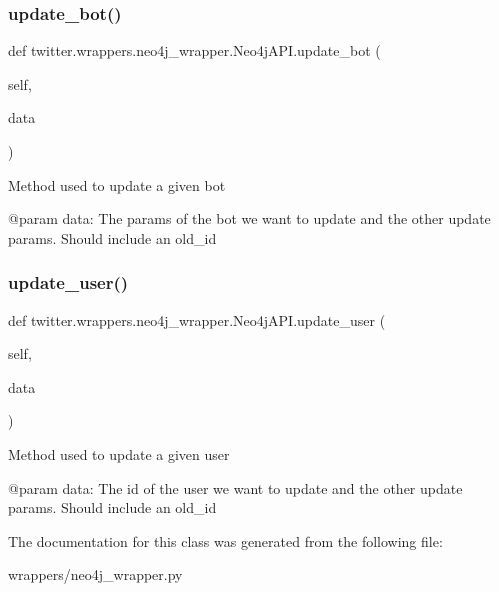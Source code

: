\subsubsection{\texorpdfstring{update\+\_\+bot()}{update\_bot()}}
{\footnotesize\ttfamily def twitter.\+wrappers.\+neo4j\+\_\+wrapper.\+Neo4j\+A\+P\+I.\+update\+\_\+bot (\begin{DoxyParamCaption}\item[{}]{self,  }\item[{}]{data }\end{DoxyParamCaption})}

\begin{DoxyVerb}Method used to update a given bot

@param data: The params of the bot we want to update and the other update params. Should include an old_id
\end{DoxyVerb}
 \mbox{\label{classtwitter_1_1wrappers_1_1neo4j__wrapper_1_1Neo4jAPI_a8efba948fa1e68c7b3fe9a604bce53db}} 
\subsubsection{\texorpdfstring{update\+\_\+user()}{update\_user()}}
{\footnotesize\ttfamily def twitter.\+wrappers.\+neo4j\+\_\+wrapper.\+Neo4j\+A\+P\+I.\+update\+\_\+user (\begin{DoxyParamCaption}\item[{}]{self,  }\item[{}]{data }\end{DoxyParamCaption})}

\begin{DoxyVerb}Method used to update a given user

@param data: The id of the user we want to update and the other update params. Should include an old_id
\end{DoxyVerb}
 

The documentation for this class was generated from the following file\+:\begin{DoxyCompactItemize}
\item 
wrappers/neo4j\+\_\+wrapper.\+py\end{DoxyCompactItemize}
